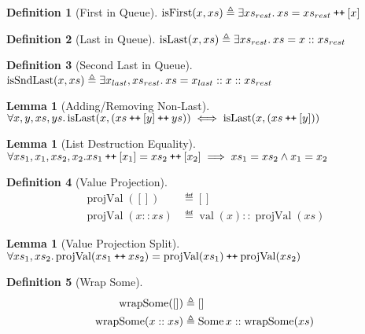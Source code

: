 \documentclass[a4paper, 10pt]{report}
\theoremstyle{definition}
\newtheorem{lemma}[theorem]{Lemma}
\newtheorem{definition}{Definition}[section]
\newcommand{\projval}{\operatorname{projVal}}
\newcommand{\wrapsome}{\operatorname{wrapSome}}
\newcommand{\isFirst}{\operatorname{isFirst}}
\newcommand{\isLast}{\operatorname{isLast}}
\newcommand{\isSndLast}{\operatorname{isSndLast}}
\newcommand{\nVal}[1]{\operatorname{val}(#1)}
\newcommand\catenate{\mathbin{\text{\ttfamily\upshape ++}}}
\begin{document}
\begin{definition}[First in Queue]\label{COMMON:Def:first-q}
  $\isFirst(x, xs) \eqdef \Exists xs_{rest} . xs = xs_{rest} \catenate [x]$
\end{definition}

\begin{definition}[Last in Queue]\label{COMMON:Def:last-q}
  $\isLast(x, xs) \eqdef \Exists xs_{rest} . xs = x :: xs_{rest}$
\end{definition}

\begin{definition}[Second Last in Queue]\label{COMMON:Def:sndlast-q}
  $\isSndLast(x, xs) \eqdef \Exists x_{last}, xs_{rest} . xs = x_{last} :: x :: xs_{rest}$
\end{definition}

\begin{lemma}[Adding/Removing Non-Last]\label{lemma:isLast-remove}
  $\All x, y, xs, ys.\\
  \isLast(x, (xs \catenate [y] \catenate ys)) \iff \isLast(x, (xs \catenate [y]))$
\end{lemma}

\begin{lemma}[List Destruction Equality]\label{lemma:list-last-eq}
  $\All xs_1, x_1, xs_2, x_2.\\
  xs_1 \catenate [x_1] = xs_2 \catenate [x_2] \implies xs_1 = xs_2 \land{} x_1 = x_2$
\end{lemma}

\begin{definition}[Value Projection]\label{COMMON:Def:val-proj}
  \begin{align*}
    \projval([]) &\eqdef []\\
    \projval(x :: xs) &\eqdef \nVal{x} :: \projval(xs)
  \end{align*}
\end{definition}

\begin{lemma}[Value Projection Split]\label{lemma:value-proj-split}
  $\All xs_1, xs_2.\\
  \projval(xs_1 \catenate xs_2) = \projval(xs_1) \catenate \projval(xs_2)$
\end{lemma}

\begin{definition}[Wrap Some]\label{COMMON:Def:wrap-some}
  \begin{align*}
    \wrapsome([]) &\eqdef []\\
    \wrapsome(x :: xs) &\eqdef \Some{x} :: \wrapsome(xs)
  \end{align*}
\end{definition}
\end{document}
